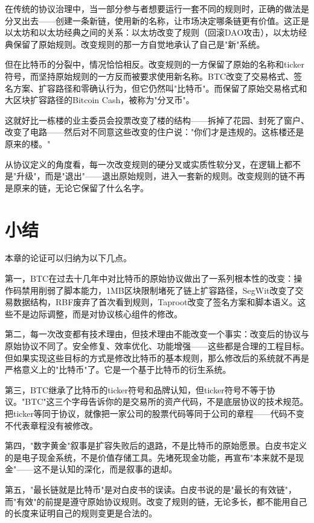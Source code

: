 \documentclass[a4paper,12pt,openany]{ctexbook}
\begin{document}
在传统的协议治理中，当一部分参与者想要运行一套不同的规则时，正确的做法是分叉出去——创建一条新链，使用新的名称，让市场决定哪条链更有价值。这正是以太坊和以太坊经典之间的关系：以太坊改变了规则（回滚DAO攻击），以太坊经典保留了原始规则。改变规则的那一方自觉地承认了自己是"新"系统。

但在比特币的分裂中，情况恰恰相反。改变规则的一方保留了原始的名称和ticker符号，而坚持原始规则的一方反而被要求使用新名称。BTC改变了交易格式、签名方案、扩容路径和零确认行为，但它仍然叫"比特币"。而保留了原始交易格式和大区块扩容路径的Bitcoin Cash，被称为"分叉币"。

这就好比一栋楼的业主委员会投票改变了楼的结构——拆掉了花园、封死了窗户、改变了电路——然后对不同意这些改变的住户说："你们才是违规的。这栋楼还是原来的楼。"

从协议定义的角度看，每一次改变规则的硬分叉或实质性软分叉，在逻辑上都不是"升级"，而是"退出"——退出原始规则，进入一套新的规则。改变规则的链不再是原来的链，无论它保留了什么名字。


\section*{小结}


本章的论证可以归纳为以下几点。

第一，BTC在过去十几年中对比特币的原始协议做出了一系列根本性的改变：操作码禁用削弱了脚本能力，1MB区块限制堵死了链上扩容路径，SegWit改变了交易数据结构，RBF废弃了首次看到规则，Taproot改变了签名方案和脚本语义。这些不是边际调整，而是对协议核心组件的修改。

第二，每一次改变都有技术理由，但技术理由不能改变一个事实：改变后的协议与原始协议不同了。安全修复、效率优化、功能增强——这些都是合理的工程目标。但如果实现这些目标的方式是修改比特币的基本规则，那么修改后的系统就不再是严格意义上的"比特币"了。它是一个基于比特币的衍生系统。

第三，BTC继承了比特币的ticker符号和品牌认知，但ticker符号不等于协议。"BTC"这三个字母告诉你的是交易所的资产代码，不是底层协议的技术规范。把ticker等同于协议，就像把一家公司的股票代码等同于公司的章程——代码不变不代表章程没有被修改。

第四，"数字黄金"叙事是扩容失败后的退路，不是比特币的原始愿景。白皮书定义的是电子现金系统，不是价值存储工具。先堵死现金功能，再宣布"本来就不是现金"——这不是认知的深化，而是叙事的退却。

第五，"最长链就是比特币"是对白皮书的误读。白皮书说的是"最长的有效链"，而"有效"的前提是遵守原始协议规则。改变了规则的链，无论多长，都不能用自己的长度来证明自己的规则变更是合法的。
\end{document}
